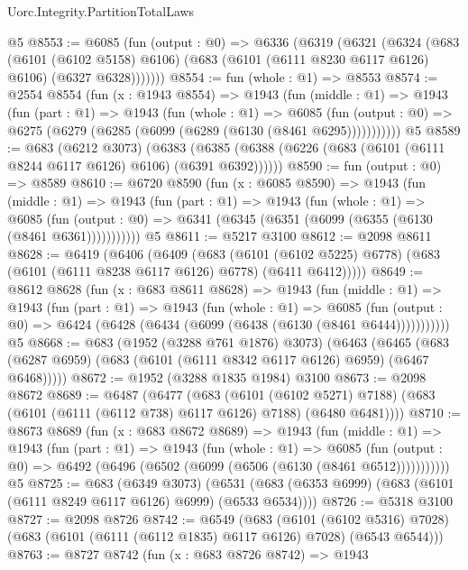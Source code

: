 \begin{lexlean}{Uorc.Integrity.PartitionTotalLaws}
\begin{coremodule}
    @5
@8553 := @6085
    (fun (output : @0) =>
    @6336
      (@6319
        (@6321
          (@6324
            (@683
              (@6101 (@6102 @5158) @6106)
              (@683 (@6101 (@6111 @8230 @6117 @6126) @6106) (@6327 @6328)))))))
@8554 := fun (whole : @1) => @8553
@8574 := @2554
    @8554
    (fun (x : @1943 @8554) =>
    @1943
      (fun (middle : @1) =>
      @1943
        (fun (part : @1) =>
        @1943
          (fun (whole : @1) =>
          @6085
            (fun (output : @0) => @6275 (@6279 (@6285 (@6099 (@6289 (@6130 (@8461 @6295)))))))))))
    @5
@8589 := @683
    (@6212 @3073)
    (@6383 (@6385 (@6388 (@6226 (@683 (@6101 (@6111 @8244 @6117 @6126) @6106) (@6391 @6392))))))
@8590 := fun (output : @0) => @8589
@8610 := @6720
    @8590
    (fun (x : @6085 @8590) =>
    @1943
      (fun (middle : @1) =>
      @1943
        (fun (part : @1) =>
        @1943
          (fun (whole : @1) =>
          @6085
            (fun (output : @0) => @6341 (@6345 (@6351 (@6099 (@6355 (@6130 (@8461 @6361)))))))))))
    @5
@8611 := @5217 @3100
@8612 := @2098 @8611
@8628 := @6419
    (@6406
      (@6409
        (@683
          (@6101 (@6102 @5225) @6778)
          (@683 (@6101 (@6111 @8238 @6117 @6126) @6778) (@6411 @6412)))))
@8649 := @8612
    @8628
    (fun (x : @683 @8611 @8628) =>
    @1943
      (fun (middle : @1) =>
      @1943
        (fun (part : @1) =>
        @1943
          (fun (whole : @1) =>
          @6085
            (fun (output : @0) => @6424 (@6428 (@6434 (@6099 (@6438 (@6130 (@8461 @6444)))))))))))
    @5
@8668 := @683
    (@1952 (@3288 @761 @1876) @3073)
    (@6463
      (@6465 (@683 (@6287 @6959) (@683 (@6101 (@6111 @8342 @6117 @6126) @6959) (@6467 @6468)))))
@8672 := @1952 (@3288 @1835 @1984) @3100
@8673 := @2098 @8672
@8689 := @6487
    (@6477
      (@683
        (@6101 (@6102 @5271) @7188)
        (@683 (@6101 (@6111 (@6112 @738) @6117 @6126) @7188) (@6480 @6481))))
@8710 := @8673
    @8689
    (fun (x : @683 @8672 @8689) =>
    @1943
      (fun (middle : @1) =>
      @1943
        (fun (part : @1) =>
        @1943
          (fun (whole : @1) =>
          @6085
            (fun (output : @0) => @6492 (@6496 (@6502 (@6099 (@6506 (@6130 (@8461 @6512)))))))))))
    @5
@8725 := @683
    (@6349 @3073)
    (@6531 (@683 (@6353 @6999) (@683 (@6101 (@6111 @8249 @6117 @6126) @6999) (@6533 @6534))))
@8726 := @5318 @3100
@8727 := @2098 @8726
@8742 := @6549
    (@683
      (@6101 (@6102 @5316) @7028)
      (@683 (@6101 (@6111 (@6112 @1835) @6117 @6126) @7028) (@6543 @6544)))
@8763 := @8727
    @8742
    (fun (x : @683 @8726 @8742) =>
    @1943

\end{coremodule}
\end{lexlean}
